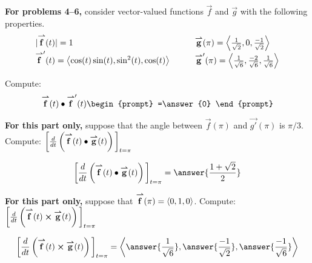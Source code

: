 \documentclass{ximera}
\author{Bart Snapp}
\begin{document}
\textbf{For problems 4--6,} consider vector-valued functions
$\vec{f}$ and $\vec{g}$ with the following properties.
\[
\begin{array}{lll}
  |{\overset{\boldsymbol{\rightharpoonup}}{\mathbf{f}}}(t)| = 1    &\quad         & {\overset{\boldsymbol{\rightharpoonup}}{\mathbf{g}}}(\pi) = \left\langle \frac{1}{\sqrt{2}},0,\frac{-1}{\sqrt{2}}\right\rangle  \\
  {\overset{\boldsymbol{\rightharpoonup}}{\mathbf{f}}}'(t) = \left\langle \cos(t)\sin(t),\sin^2(t),\cos(t)\right\rangle    &\quad         & {\overset{\boldsymbol{\rightharpoonup}}{\mathbf{g}}}'(\pi)  = \left\langle \frac{1}{\sqrt{6}},\frac{-2}{\sqrt{6}},\frac{1}{\sqrt{6}}\right\rangle   
\end{array}
\]
\begin{problem}
  Compute:
  \[
  \vec{f}(t)\dotp \vec{f}'(t)
  \begin{prompt}
    =\answer{0}
  \end{prompt}
  \]

  \vfill
  
\end{problem}

\begin{problem}
  \textbf{For this part only,} suppose that the angle between
  $\vec{f}(\pi)$ and $\vec{g'}(\pi)$ is $\pi/3$.  Compute: $\bigg[ \frac{\mathop{}\!d }{\mathop{}\!d t} \left({\overset{\boldsymbol{\rightharpoonup}}{\mathbf{f}}}(t) \bullet {\overset{\boldsymbol{\rightharpoonup}}{\mathbf{g}}}(t)\right) \bigg]_{t=\pi}$
\begin{prompt}
  \[
  \eval{\dd{t} \left(\vec{f}(t) \dotp \vec{g}(t)\right)}_{t=\pi}
  = \answer{\frac{1+\sqrt{2}}{2}}
  \]
\end{prompt}

  \vfill
  
\end{problem}

\begin{problem}
  \textbf{For this part only,} suppose that ${\overset{\boldsymbol{\rightharpoonup}}{\mathbf{f}}}(\pi) =
  \left\langle 0,1,0\right\rangle$. Compute: $\bigg[ \frac{\mathop{}\!d }{\mathop{}\!d t} \left({\overset{\boldsymbol{\rightharpoonup}}{\mathbf{f}}}(t) \boldsymbol\times {\overset{\boldsymbol{\rightharpoonup}}{\mathbf{g}}}(t)\right) \bigg]_{t=\pi}$
  \begin{prompt}
    \[
    \eval{\dd{t} \left(\vec{f}(t) \cross \vec{g}(t)\right)}_{t=\pi}
    =\vector{\answer{\frac{1}{\sqrt{6}}},\answer{\frac{-1}{\sqrt{2}}},\answer{\frac{-1}{\sqrt{6}}}}
    \]
  \end{prompt}

  \vfill
  
\end{problem}
\end{document}
